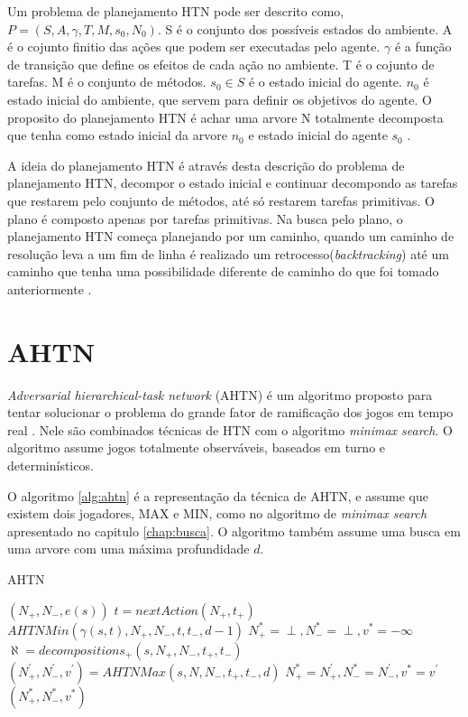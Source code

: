 Um problema de planejamento HTN pode ser descrito como, $ P = (S, A, \gamma, T, M, s_{0}, N_{0}) $. S é o conjunto dos possíveis estados do ambiente. A é o cojunto finitio das ações que podem ser executadas pelo agente. $\gamma$ é a função de transição que define os efeitos de cada ação no ambiente. T é o cojunto de tarefas. M é o conjunto de métodos. $s_{0} \in S$ é o estado inicial do agente. $n_{0}$ é estado inicial do ambiente, que servem para definir os objetivos do agente. O proposito do planejamento HTN é achar uma arvore N totalmente decomposta que tenha como estado inicial da arvore $n_{0}$ e estado inicial do agente $s_{0}$ \cite{ontanon2015adversarial}.

A ideia do planejamento HTN é através desta descrição do problema de planejamento HTN, decompor o estado inicial e continuar decompondo as tarefas que restarem pelo conjunto de métodos, até só restarem tarefas primitivas. O plano é composto apenas por tarefas primitivas. Na busca pelo plano, o planejamento HTN começa planejando por um caminho, quando um caminho de resolução leva a um fim de linha é realizado um retrocesso(\textit{backtracking}) até um caminho que tenha uma possibilidade diferente de caminho do que foi tomado anteriormente \cite{intelligence2003modern}. 

\section{AHTN} 

\textit{Adversarial hierarchical-task network} (AHTN) é um algoritmo proposto para tentar solucionar o problema do grande fator de ramificação dos jogos em tempo real \cite{ontanon2015adversarial}. Nele são combinados técnicas de HTN com o algoritmo \textit{minimax search}. O algoritmo assume jogos totalmente observáveis, baseados em turno e determinísticos.

O algoritmo \ref{alg:ahtn} \cite{ontanon2015adversarial} é a representação da técnica de AHTN, e assume que existem dois jogadores, MAX e MIN, como no algoritmo de \textit{minimax search} apresentado no capitulo \ref{chap:busca}. O algoritmo também assume uma busca em uma arvore com uma máxima profundidade $d$.

\begin{algorithm}
	\caption{AHTN}
	\label{alg:ahtn}
	\begin{algorithmic}[1]		
		\State	\Return $(N_{+}, N_{-}, e(s))$
		\EndIf
		\State $t = nextAction(N_{+}, t_{+})$ 
		\State \Return $AHTNMin(\gamma(s,t), N_{+}, N_{-}, t, t_{-}, d-1)$
		\EndIf
		\State $N_{+}^{*} = \perp, N_{-}^{*} = \perp, v^{*} = -\infty$
		\State $\aleph = decompositions_{+}(s, N_{+}, N_{-}, t_{+}, t_{-})$
		\State $(N^{'}_{+}, N^{'}_{-}, v^{'}) = AHTNMax(s, N, N_{-}, t_{+}, t_{-}, d)$
		\State $N_{+}^{*} = N^{'}_{+}, N_{-}^{*} = N^{'}_{-}, v^{*} = v^{'} $
		\EndIf
		\EndFor		
		\State \Return $(N_{+}^{*}, N_{-}^{*}, v^{*} )$
		\EndFunction
	\end{algorithmic}
\end{algorithm}

